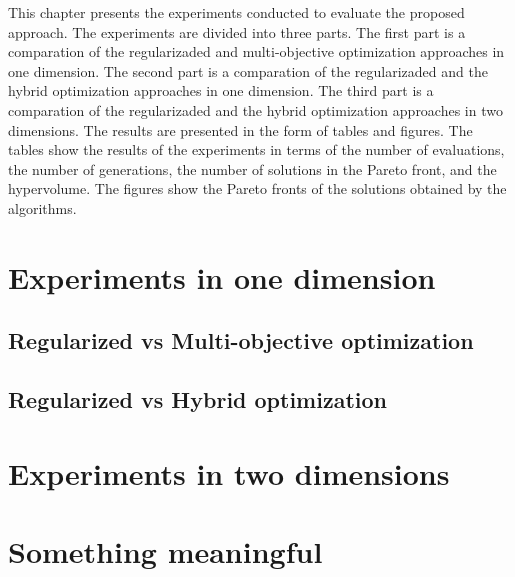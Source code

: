 This chapter presents the experiments conducted to evaluate the proposed approach. The experiments are divided into three parts. The first part is a comparation of the regularizaded and multi-objective optimization approaches in one dimension. The second part is a comparation of the regularizaded and the hybrid optimization approaches in one dimension. The third part is a comparation of the regularizaded and the hybrid optimization approaches in two dimensions. The results are presented in the form of tables and figures. The tables show the results of the experiments in terms of the number of evaluations, the number of generations, the number of solutions in the Pareto front, and the hypervolume. The figures show the Pareto fronts of the solutions obtained by the algorithms. 


\section{Experiments in one dimension}

\subsection{Regularized vs Multi-objective optimization}

%

\subsection{Regularized vs Hybrid optimization}

%

\section{Experiments in two dimensions}

%

\section{Something meaningful}


